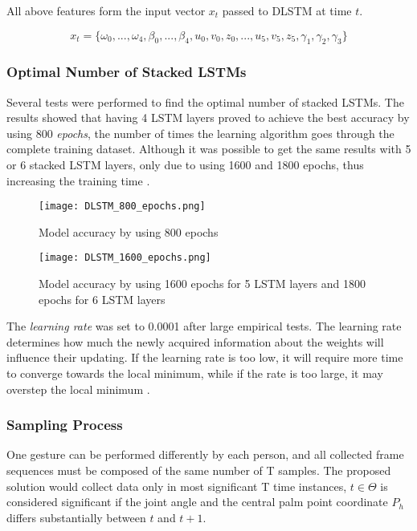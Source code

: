 All above features form the input vector $x_t$ passed to DLSTM at time $t$.

\begin{equation}
	{x_t = \{\omega_0, ...,\omega_4, \beta_0, ..., \beta_4, u_0,v_0,z_0, ..., u_5,v_5,z_5, \gamma_1, \gamma_2, \gamma_3\}}
\end{equation}

\subsubsection{Optimal Number of Stacked LSTMs}

Several tests were performed to find the optimal number of stacked LSTMs. The results showed that having 4 LSTM layers proved to achieve the best accuracy by using 800 \textit{epochs}, the number of times the learning algorithm goes through the complete training dataset. Although it was possible to get the same results with 5 or 6 stacked LSTM layers, only due to using 1600 and 1800 epochs, thus increasing the training time \cite{avola}. 

\begin{figure}[ht]
	\centering
    \texttt{[image: DLSTM\_800\_epochs.png]}
	\caption{Model accuracy by using 800 epochs \cite{avola}}
	\label{fig:DLSTM_800_epochs}
\end{figure}

\begin{figure}[ht]
	\centering
    \texttt{[image: DLSTM\_1600\_epochs.png]}
	\caption{Model accuracy by using 1600 epochs for 5 LSTM layers and 1800 epochs for 6 LSTM layers \cite{avola}}
	\label{fig:DLSTM_1600_epochs}
\end{figure}

The \textit{learning rate} was set to 0.0001 after large empirical tests. The learning rate determines how much the newly acquired information about the weights will influence their updating. If the learning rate is too low, it will require more time to converge towards the local minimum, while if the rate is too large, it may overstep the local minimum \cite{avola}.

\subsubsection{Sampling Process}

One gesture can be performed differently by each person, and all collected frame sequences must be composed of the same number of T samples. The proposed solution would collect data only in most significant T time instances, $t \in \Theta$ is considered significant if the joint angle and the central palm point coordinate $P_h$ differs substantially between $t$ and $t+1$.

